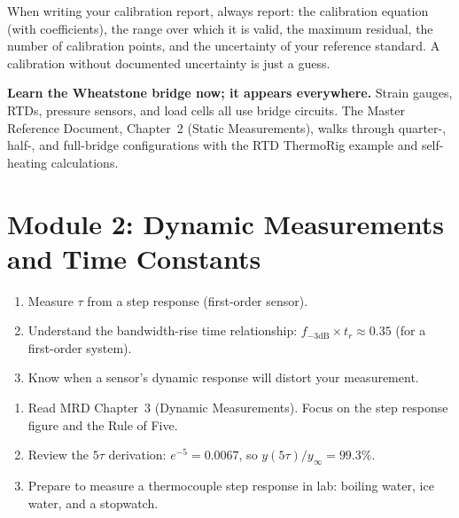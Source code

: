 \documentclass[11pt,letterpaper]{article}
\begin{document}
\begin{tipbox}
When writing your calibration report, always report: the calibration equation (with coefficients), the range over which it is valid, the maximum residual, the number of calibration points, and the uncertainty of your reference standard. A calibration without documented uncertainty is just a guess.
\end{tipbox}

\begin{protip}
\textbf{Learn the Wheatstone bridge now; it appears everywhere.} Strain gauges, RTDs, pressure sensors, and load cells all use bridge circuits. The Master Reference Document, Chapter~2 (Static Measurements), walks through quarter-, half-, and full-bridge configurations with the RTD ThermoRig example and self-heating calculations.
\end{protip}

\section{Module 2: Dynamic Measurements and Time Constants}

\begin{priorities}
\begin{enumerate}[leftmargin=*, itemsep=1pt, topsep=0pt]
    \item Measure $\tau$ from a step response (first-order sensor).
    \item Understand the bandwidth-rise time relationship: $f_{-3\text{dB}} \times t_r \approx 0.35$ (for a first-order system).
    \item Know when a sensor's dynamic response will distort your measurement.
\end{enumerate}
\end{priorities}

\begin{tcolorbox}[colback=minesblue!3, colframe=minesblue!40, boxrule=0.5pt, arc=2pt, left=6pt, right=6pt, top=3pt, bottom=3pt, fonttitle=\small\bfseries\color{minesblue}, title={Before You Start: Module 2}]
\small
\begin{enumerate}[nosep,leftmargin=*]
\item Read MRD Chapter~3 (Dynamic Measurements). Focus on the step response figure and the Rule of Five.
\item Review the $5\tau$ derivation: $e^{-5} = 0.0067$, so $y(5\tau)/y_\infty = 99.3\%$.
\item Prepare to measure a thermocouple step response in lab: boiling water, ice water, and a stopwatch.
\end{enumerate}
\end{tcolorbox}
\end{document}
